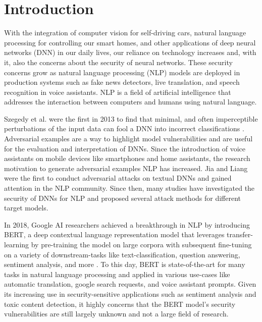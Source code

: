 
\section{Introduction}

With the integration of computer vision for self-driving cars, natural language processing for controlling our smart homes, and other applications of deep neural networks (DNN) in our daily lives, our reliance on technology increases and, with it, also the concerns about the security of neural networks. These security concerns grow as natural language processing (NLP) models are deployed in production systems such as fake news detectors, live translation, and speech recognition in voice assistants. NLP is a field of artificial intelligence that addresses the interaction between computers and humans using natural language.  

Szegedy et al. were the first in 2013 to find that minimal, and often imperceptible perturbations of the input data can fool a DNN into incorrect classifications \cite{szegedy2013intriguing}.
Adversarial examples are a way to highlight model vulnerabilities and are useful for the evaluation and interpretation of DNNs. 
Since the introduction of voice assistants on mobile devices like smartphones and home assistants, the research motivation to generate adversarial examples NLP has increased. Jia and Liang were the first to conduct adversarial attacks on textual DNNs and gained attention in the NLP community\cite{Jia2017AdversarialEF}. Since then, many studies have investigated the security of DNNs for NLP and proposed several attack methods for different target models. 

In 2018, Google AI researchers achieved a breakthrough in NLP by introducing BERT, a deep contextual language representation model that leverages transfer-learning by pre-training the model on large corpora with subsequent fine-tuning on a variety of downstream-tasks like text-classification, question answering, sentiment analysis, and more \cite{devlin2018bert}. To this day, BERT is state-of-the-art for many tasks in natural language processing and applied in various use-cases like automatic translation, google search requests, and voice assistant prompts. 
Given its increasing use in security-sensitive applications such as sentiment analysis and toxic content detection, it highly concerns that the BERT model's security vulnerabilities are still largely unknown and not a large field of research.

